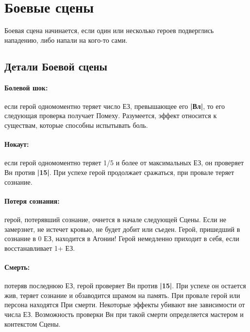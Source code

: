 \section{Боевые сцены}
Боевая сцена начинается, если один или несколько героев подверглись нападению, либо напали на кого-то сами.

\subsection{Детали Боевой сцены}
\paragraph{Болевой шок:} если герой одномоментно теряет число ЕЗ, превышающее его \textbf{|Вл|}, то его следующая проверка получает Помеху. 
Разумеется, эффект относится к существам, которые способны испытывать боль. 
\paragraph{Нокаут:} если герой одномоментно теряет 1/5 и более от максимальных ЕЗ, он проверяет Вн против \textbf{|15|}. При успехе герой продолжает сражаться, при провале теряет сознание.
\paragraph{Потеря сознания:} герой, потерявший сознание, очнется в начале следующей Сцены. Если не замерзнет, не истечет кровью, не будет добит или съеден. Герой, пришедший в сознание в 0 ЕЗ, находится в Агонии!
\newline Герой немедленно приходит в себя, если восстанавливает 1+ ЕЗ.
\paragraph{Смерть:} потеряв последнюю ЕЗ, герой проверяет Вн против \textbf{|15|}. При успехе он остается жив, теряет сознание и обзаводится шрамом на память. При провале герой или персона находятся При смерти.
\newline Некоторые эффекты убивают вне зависимости от числа ЕЗ. Возможность проверки Вн при такой смерти определяется мастером и контекстом Сцены.
